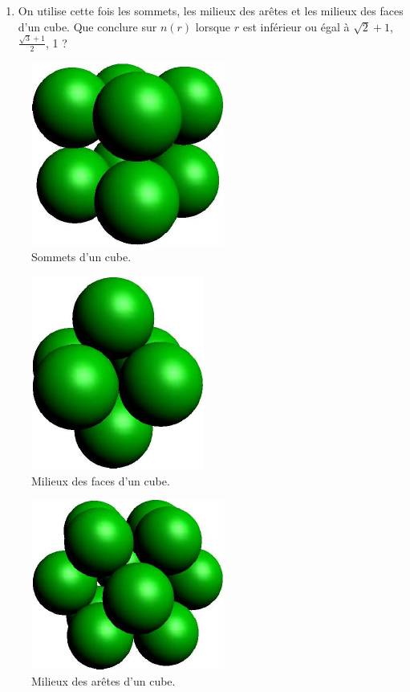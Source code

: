 \begin{enumerate}
\begin{enumerate}
\item On utilise cette fois les sommets, les milieux des arêtes et les milieux des faces d'un cube.\newline
Que conclure sur $n(r)$ lorsque $r$ est inférieur ou égal à $\sqrt{2}+1$, $\frac{\sqrt{3}+1}{2}$, 1 ?
\end{enumerate}
\begin{figure}[h!t]
 \centering
 \includegraphics{./Esphertan_4.pdf}
 \caption{Sommets d'un cube.}
 \label{fig:Esphertan_4}
\end{figure}
\begin{figure}[h!t]
 \centering
 \includegraphics{./Esphertan_5.pdf}
 \caption{Milieux des faces d'un cube.}
 \label{fig:Esphertan_5}
\end{figure}
\begin{figure}[h!t]
 \centering
 \includegraphics{./Esphertan_6.pdf}
 \caption{Milieux des arêtes d'un cube.}
 \label{fig:Esphertan_6}
\end{figure}


\end{enumerate}
